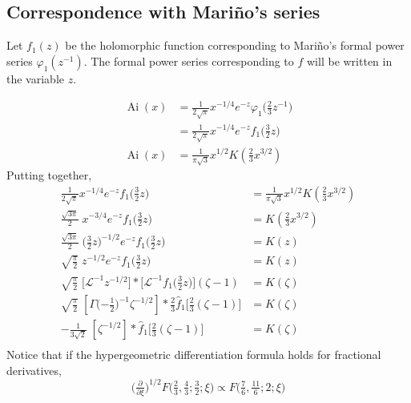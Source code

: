 \documentclass{article}
\newcommand{\laplace}{\mathcal{L}}
\DeclareMathOperator{\Ai}{Ai}
\begin{document}
\subsection{Correspondence with Mari\~{n}o's series}
Let $f_1(z)$ be the holomorphic function corresponding to Mari\~{n}o's formal power series $\varphi_1(z^{-1})$. The formal power series corresponding to $f$ will be written in the variable $z$.

\begin{align*}
\Ai(x) & = \tfrac{1}{2\sqrt{\pi}} x^{-1/4} e^{-z} \varphi_1\big(\tfrac{2}{3} z^{-1}\big) \\
& = \tfrac{1}{2\sqrt{\pi}} x^{-1/4} e^{-z} f_1\big(\tfrac{3}{2} z\big) \\
\Ai(x) & = \frac{1}{\pi\sqrt{3}} x^{1/2} K(\tfrac{2}{3} x^{3/2})
\end{align*}
Putting together,
\begin{align*}
\tfrac{1}{2\sqrt{\pi}} x^{-1/4} e^{-z} f_1\big(\tfrac{3}{2} z\big) & = \frac{1}{\pi\sqrt{3}} x^{1/2} K(\tfrac{2}{3} x^{3/2}) \\
\tfrac{\sqrt{3\pi}}{2}\;x^{-3/4} e^{-z} f_1\big(\tfrac{3}{2} z\big) & = K(\tfrac{2}{3} x^{3/2}) \\
\tfrac{\sqrt{3\pi}}{2}\;\big(\tfrac{3}{2} z)^{-1/2} e^{-z} f_1\big(\tfrac{3}{2} z\big) & = K(z) \\
\sqrt{\tfrac{\pi}{2}}\;z^{-1/2} e^{-z} f_1\big(\tfrac{3}{2} z\big) & = K(z) \\
\sqrt{\tfrac{\pi}{2}}\;\big[\laplace^{-1} z^{-1/2}\big] * \big[\laplace^{-1} f_1\big(\tfrac{3}{2} z\big)\big](\zeta - 1) & = \hat{K}(\zeta) \\
\sqrt{\tfrac{\pi}{2}}\;\left[\Gamma\big({-\tfrac{1}{2}}\big)^{-1} \zeta^{-1/2}\right] * \tfrac{2}{3} \hat{f}_1\big[\tfrac{2}{3}(\zeta - 1)\big] & = \hat{K}(\zeta) \\
-\tfrac{1}{3\sqrt{2}}\;\left[\zeta^{-1/2}\right] * \hat{f}_1\big[\tfrac{2}{3}(\zeta - 1)\big] & = \hat{K}(\zeta) \\
\end{align*}
Notice that if the hypergeometric differentiation formula holds for fractional derivatives,
\[ \big(\tfrac{\partial}{\partial \xi}\big)^{1/2}F\big(\tfrac{2}{3}, \tfrac{4}{3}; \tfrac{3}{2}; \xi\big) \propto F\big(\tfrac{7}{6}, \tfrac{11}{6}; 2; \xi\big) \]


\end{document}
